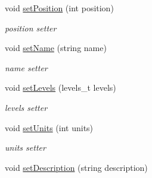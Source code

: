 \begin{DoxyCompactItemize}
void \hyperlink{classfwi_1_1grid_1_1GridField_a9ebc83083237e900b3219d2c1f073bbf}{set\-Position} (int position)
\begin{DoxyCompactList}\small\item\em position setter \end{DoxyCompactList}\item 
void \hyperlink{classfwi_1_1grid_1_1GridField_abc8c3c5b6593505fcab6737aec862b4a}{set\-Name} (string name)
\begin{DoxyCompactList}\small\item\em name setter \end{DoxyCompactList}\item 
\hypertarget{classfwi_1_1grid_1_1GridField_abea44ecf69c23d5ff1eea9360cf51159}{void \hyperlink{classfwi_1_1grid_1_1GridField_abea44ecf69c23d5ff1eea9360cf51159}{set\-Levels} (levels\-\_\-t levels)}\label{classfwi_1_1grid_1_1GridField_abea44ecf69c23d5ff1eea9360cf51159}

\begin{DoxyCompactList}\small\item\em levels setter \end{DoxyCompactList}\item 
\hypertarget{classfwi_1_1grid_1_1GridField_aac18e3cc6e533e022dd9aeaa53da4950}{void \hyperlink{classfwi_1_1grid_1_1GridField_aac18e3cc6e533e022dd9aeaa53da4950}{set\-Units} (int units)}\label{classfwi_1_1grid_1_1GridField_aac18e3cc6e533e022dd9aeaa53da4950}

\begin{DoxyCompactList}\small\item\em units setter \end{DoxyCompactList}\item 
\hypertarget{classfwi_1_1grid_1_1GridField_a689cdbdc55b5f51bfbb43f42f449d22a}{void \hyperlink{classfwi_1_1grid_1_1GridField_a689cdbdc55b5f51bfbb43f42f449d22a}{set\-Description} (string description)}\label{classfwi_1_1grid_1_1GridField_a689cdbdc55b5f51bfbb43f42f449d22a}


\end{DoxyCompactItemize}
